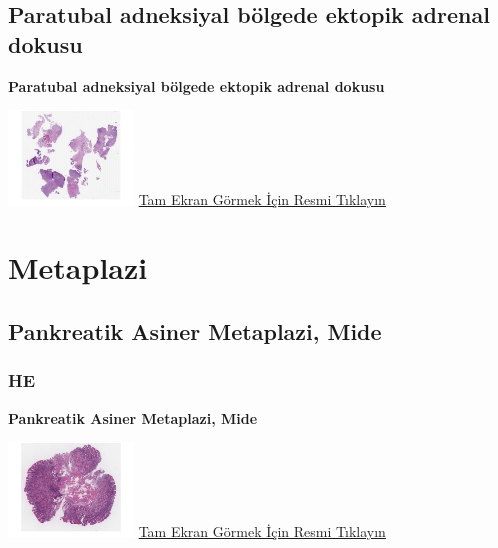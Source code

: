 \documentclass[
  letterpaper,
  DIV=11,
  numbers=noendperiod]{scrreprt}
\begin{document}
\hypertarget{sec-paratubal-adneksiyal-bolgede-ektopik-adrenal}{%
\section{Paratubal adneksiyal bölgede ektopik adrenal
dokusu}\label{sec-paratubal-adneksiyal-bolgede-ektopik-adrenal}}

\textbf{Paratubal adneksiyal bölgede ektopik adrenal dokusu}

\href{https://images.patolojiatlasi.com/ectopic-adrenal/HE.html}{\includegraphics[width=0.25\textwidth,height=\textheight]{./screenshots/thumbnail_ectopic-adrenal.png}}
\href{https://images.patolojiatlasi.com/ectopic-adrenal/HE.html}{Tam
Ekran Görmek İçin Resmi Tıklayın}

\hypertarget{sec-metaplazi}{%
\chapter{Metaplazi}\label{sec-metaplazi}}

\hypertarget{sec-pankreatik-asiner-metaplazi}{%
\section{Pankreatik Asiner Metaplazi,
Mide}\label{sec-pankreatik-asiner-metaplazi}}

\hypertarget{he-6}{%
\subsection{HE}\label{he-6}}

\textbf{Pankreatik Asiner Metaplazi, Mide}

\href{https://images.patolojiatlasi.com/metaplasia/HE.html}{\includegraphics[width=0.25\textwidth,height=\textheight]{./screenshots/thumbnail_metaplasia.png}}
\href{https://images.patolojiatlasi.com/metaplasia/HE.html}{Tam Ekran
Görmek İçin Resmi Tıklayın}
\end{document}
